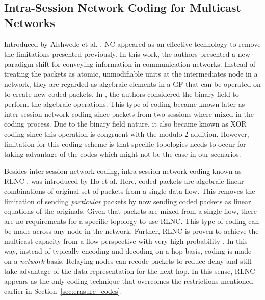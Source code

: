 \subsection{Intra-Session Network Coding for Multicast Networks}
\label{sec:nc_rlnc}
Introduced by Alshwede et al. \cite{ahlswede2000network}, \ac{NC} appeared as an effective technology to remove the limitations presented previously. In this work, the authors presented a new paradigm shift for conveying information in communication networks. Instead of treating the packets as atomic, unmodifiable units at the intermediates node in a network, they are regarded as algebraic elements in a \ac{GF} that can be operated on to create new coded packets. In \cite{ahlswede2000network}, the authors considered the binary field to perform the algebraic operations. This type of coding became known later as inter-session network coding since packets from two sessions where mixed in the coding process. Due to the binary field nature, it also became known as XOR coding since this operation is congruent with the modulo-2 addition. However, limitation for this coding scheme is that specific topologies needs to occur for taking advantage of the codes which might not be the case in our scenarios.

Besides inter-session network coding, intra-session network coding known as \ac{RLNC} \cite{ho2006random}, was introduced by Ho et al. Here, coded packets are algebraic linear combinations of original set of packets from a single data flow. This removes the limitation of sending \textit{particular} packets by now sending coded packets as linear equations of the originals. Given that packets are mixed from a single flow, there are no requirements for a specific topology to use \ac{RLNC}. This type of coding can be made across any node in the network. Further, \ac{RLNC} is proven to achieve the multicast capacity from a flow perspective with very high probability \cite{koetter2003algebraic,ho2006random}. In this way, instead of typically encoding and decoding on a hop basis, coding is made on a \textit{network} basis. Relaying nodes can recode packets to reduce delay and still take advantage of the data representation for the next hop. In this sense, \ac{RLNC} appears as the only coding technique that overcomes the restrictions mentioned earlier in Section~\ref{sec:erasure_codes}.

